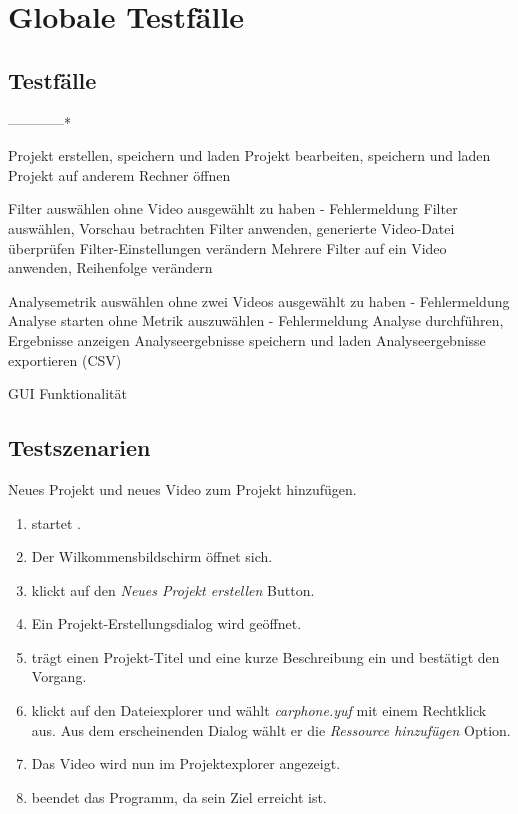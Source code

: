 \chapter{Globale Testfälle}
\section{Testfälle}
\setcounter{counterKriterien}{0}

------------*

 Projekt erstellen, speichern und laden
 Projekt bearbeiten, speichern und laden
 Projekt auf anderem Rechner öffnen

 Filter auswählen ohne Video ausgewählt zu haben - Fehlermeldung
 Filter auswählen, Vorschau betrachten
 Filter anwenden, generierte Video-Datei überprüfen
 Filter-Einstellungen verändern
 Mehrere Filter auf ein Video anwenden, Reihenfolge verändern

 Analysemetrik auswählen ohne zwei Videos ausgewählt zu haben - Fehlermeldung
 Analyse starten ohne Metrik auszuwählen - Fehlermeldung
 Analyse durchführen, Ergebnisse anzeigen
 Analyseergebnisse speichern und laden
 Analyseergebnisse exportieren (CSV)

 GUI Funktionalität




\section{Testszenarien}
\setcounter{counterKriterien}{0}


 Neues Projekt und neues Video zum Projekt hinzufügen.\\
\begin{enumerate}
\item \dAU startet \projektTitel.
\item Der Wilkommensbildschirm öffnet sich.
\item \dAU klickt auf den \emph{Neues Projekt erstellen} Button.
\item Ein Projekt-Erstellungsdialog wird geöffnet.
\item \dAU trägt einen Projekt-Titel und eine kurze Beschreibung ein und bestätigt den Vorgang.
\item \dAU klickt auf den Dateiexplorer und wählt \emph{carphone.yuf} mit einem Rechtklick aus. Aus dem erscheinenden Dialog wählt er die \emph{Ressource hinzufügen} Option.
\item Das Video wird nun im Projektexplorer angezeigt.
\item \dAU beendet das Programm, da sein Ziel erreicht ist.
\end{enumerate}


